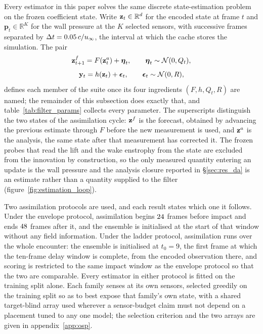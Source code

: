 Every estimator in this paper solves the same discrete state-estimation
problem on the frozen coefficient state. Write $\mathbf{z}_t \in \mathbb{R}^{d}$ for
the encoded state at frame $t$ and $\mathbf{p}_t \in \mathbb{R}^{K}$ for the
wall pressure at the $K$ selected sensors, with successive frames separated by
$\Delta t = 0.05\,c/u_\infty$, the interval at which the cache stores the
simulation. The pair
\begin{equation}
  \mathbf{z}^{f}_{t+1} = F\!\left(\mathbf{z}^{a}_{t}\right) + \boldsymbol{\eta}_t,
  \qquad \boldsymbol{\eta}_t \sim \mathcal{N}(0, Q_t),
  \label{eq:ssm_dyn}
\end{equation}
\begin{equation}
  \mathbf{y}_t = h\!\left(\mathbf{z}_t\right) + \boldsymbol{\epsilon}_t,
  \qquad \boldsymbol{\epsilon}_t \sim \mathcal{N}(0, R),
  \label{eq:ssm_obs}
\end{equation}
defines each member of the suite once its four ingredients $(F, h, Q_t, R)$
are named; the remainder of this subsection does exactly that, and
table~\ref{tab:filter_params} collects every parameter. The superscripts
distinguish the two states of the assimilation cycle: $\mathbf{z}^{f}$ is the
forecast, obtained by advancing the previous estimate through $F$ before the
new measurement is used, and $\mathbf{z}^{a}$ is the analysis, the same state after
that measurement has corrected it. The frozen probes that read the lift and the
wake enstrophy from the state are excluded from the innovation by construction,
so the only measured quantity entering an update is the wall pressure and the
analysis closure reported in \S\ref{sec:res_da} is an estimate rather than a
quantity supplied to the filter (figure~\ref{fig:estimation_loop}).\re

Two assimilation protocols are used, and each result states which one it
follows. Under the envelope protocol, assimilation begins $24$ frames
before impact and ends $48$ frames after it, and the ensemble is
initialised at the start of that window without any field information. Under
the ladder protocol, assimilation runs over the whole encounter: the ensemble
is initialised at $t_0 = 9$, the first frame at which the ten-frame delay
window is complete, from the encoded observation there, and scoring is
restricted to the same impact window as the envelope protocol so that the two
are comparable. Every estimator in either protocol is fitted on the training
split alone. Each family senses at its own sensors, selected greedily on the
training split so as to best expose that family's own state, with a shared
target-blind array used wherever a sensor-budget claim must not depend on a
placement tuned to any one model; the selection criterion and the two arrays are
given in appendix~\ref{app:osp}.\re

